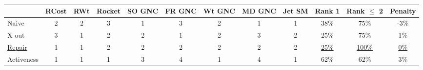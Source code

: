 \begin{tabular}{lccccccccccc}
\toprule
 & RCost & RWt & Rocket & SO GNC & FR GNC & Wt GNC & MD GNC & Jet SM & Rank 1 & Rank $\leq$ 2 & Penalty \\
\midrule
Naive & {\cellcolor[HTML]{37A055}} \color[HTML]{F1F1F1} 2 & {\cellcolor[HTML]{37A055}} \color[HTML]{F1F1F1} 2 & {\cellcolor[HTML]{AEDEA7}} \color[HTML]{000000} 3 & {\cellcolor[HTML]{00441B}} \color[HTML]{F1F1F1} 1 & {\cellcolor[HTML]{AEDEA7}} \color[HTML]{000000} 3 & {\cellcolor[HTML]{37A055}} \color[HTML]{F1F1F1} 2 & {\cellcolor[HTML]{00441B}} \color[HTML]{F1F1F1} 1 & {\cellcolor[HTML]{00441B}} \color[HTML]{F1F1F1} 1 & {\cellcolor[HTML]{9DCAE1}} \color[HTML]{000000} 38\% & {\cellcolor[HTML]{2070B4}} \color[HTML]{F1F1F1} 75\% & {\cellcolor[HTML]{00441B}} \color[HTML]{F1F1F1} -3\% \\
X out & {\cellcolor[HTML]{AEDEA7}} \color[HTML]{000000} 3 & {\cellcolor[HTML]{00441B}} \color[HTML]{F1F1F1} 1 & {\cellcolor[HTML]{37A055}} \color[HTML]{F1F1F1} 2 & {\cellcolor[HTML]{37A055}} \color[HTML]{F1F1F1} 2 & {\cellcolor[HTML]{00441B}} \color[HTML]{F1F1F1} 1 & {\cellcolor[HTML]{37A055}} \color[HTML]{F1F1F1} 2 & {\cellcolor[HTML]{AEDEA7}} \color[HTML]{000000} 3 & {\cellcolor[HTML]{37A055}} \color[HTML]{F1F1F1} 2 & {\cellcolor[HTML]{C6DBEF}} \color[HTML]{000000} 25\% & {\cellcolor[HTML]{2070B4}} \color[HTML]{F1F1F1} 75\% & {\cellcolor[HTML]{005522}} \color[HTML]{F1F1F1} 1\% \\
\underline{Repair} & {\cellcolor[HTML]{00441B}} \color[HTML]{F1F1F1} 1 & {\cellcolor[HTML]{00441B}} \color[HTML]{F1F1F1} 1 & {\cellcolor[HTML]{37A055}} \color[HTML]{F1F1F1} 2 & {\cellcolor[HTML]{37A055}} \color[HTML]{F1F1F1} 2 & {\cellcolor[HTML]{37A055}} \color[HTML]{F1F1F1} 2 & {\cellcolor[HTML]{37A055}} \color[HTML]{F1F1F1} 2 & {\cellcolor[HTML]{37A055}} \color[HTML]{F1F1F1} 2 & {\cellcolor[HTML]{37A055}} \color[HTML]{F1F1F1} 2 & {\cellcolor[HTML]{C6DBEF}} \color[HTML]{000000} \underline{25\%} & {\cellcolor[HTML]{08306B}} \color[HTML]{F1F1F1} \underline{100\%} & {\cellcolor[HTML]{00441B}} \color[HTML]{F1F1F1} \underline{0\%} \\
Activeness & {\cellcolor[HTML]{00441B}} \color[HTML]{F1F1F1} 1 & {\cellcolor[HTML]{00441B}} \color[HTML]{F1F1F1} 1 & {\cellcolor[HTML]{00441B}} \color[HTML]{F1F1F1} 1 & {\cellcolor[HTML]{AEDEA7}} \color[HTML]{000000} 3 & {\cellcolor[HTML]{F7FCF5}} \color[HTML]{000000} 4 & {\cellcolor[HTML]{00441B}} \color[HTML]{F1F1F1} 1 & {\cellcolor[HTML]{F7FCF5}} \color[HTML]{000000} 4 & {\cellcolor[HTML]{00441B}} \color[HTML]{F1F1F1} 1 & {\cellcolor[HTML]{4191C6}} \color[HTML]{F1F1F1} 62\% & {\cellcolor[HTML]{4191C6}} \color[HTML]{F1F1F1} 62\% & {\cellcolor[HTML]{05712F}} \color[HTML]{F1F1F1} 3\% \\
\bottomrule
\end{tabular}
